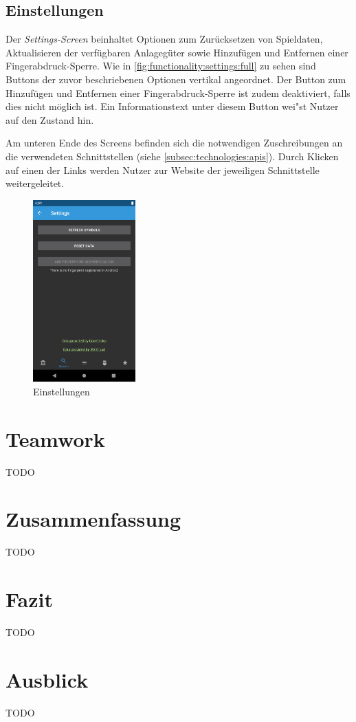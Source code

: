 \documentclass[a4paper]{article}
\begin{document}
\subsection{Einstellungen}
\label{subsec:functionality:settings}
Der \textit{Settings-Screen} beinhaltet Optionen zum Zurücksetzen von Spieldaten, Aktualisieren der verfügbaren Anlagegüter sowie Hinzufügen und Entfernen einer Fingerabdruck-Sperre.
Wie in \autoref{fig:functionality:settings:full} zu sehen sind Buttons der zuvor beschriebenen Optionen vertikal angeordnet.
Der Button zum Hinzufügen und Entfernen einer Fingerabdruck-Sperre ist zudem deaktiviert, falls dies nicht möglich ist.
Ein Informationstext unter diesem Button wei"st Nutzer auf den Zustand hin.

Am unteren Ende des Screens befinden sich die notwendigen Zuschreibungen an die verwendeten Schnittstellen (siehe \autoref{subsec:technologies:apis}).
Durch Klicken auf einen der Links werden Nutzer zur Website der jeweiligen Schnittstelle weitergeleitet.

\begin{figure}[H]
	\centering
	\includegraphics[height=7cm,keepaspectratio]{./images/settings.png}
	\caption{Einstellungen}
	\label{fig:functionality:settings:full}
\end{figure}


\section{Teamwork}
\label{sec:teamwork}
TODO


\section{Zusammenfassung}
\label{sec:summary}
TODO


\section{Fazit}
\label{sec:conclusion}
TODO


\section{Ausblick}
\label{sec:outlook}
TODO


\printbibliography[title={Referenzen}]
\end{document}
